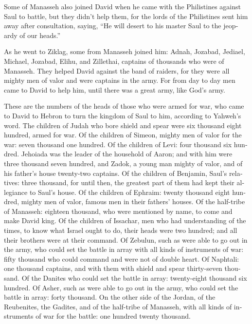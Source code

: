 \begin{paracol}{2}
\begin{otherlanguage}{english}
 Some of Manasseh also joined David when he came with the
Philistines against Saul to battle, but they didn't help them, for the
lords of the Philistines sent him away after consultation, saying, ``He
will desert to his master Saul to the jeopardy of our heads.''

 As he went to Ziklag, some from Manasseh joined him:
Adnah, Jozabad, Jediael, Michael, Jozabad, Elihu, and Zillethai,
captains of thousands who were of Manasseh.  They helped
David against the band of raiders, for they were all mighty men of valor
and were captains in the army.  For from day to day men
came to David to help him, until there was a great army, like God's
army.

 These are the numbers of the heads of those who were
armed for war, who came to David to Hebron to turn the kingdom of Saul
to him, according to Yahweh's word.  The children of
Judah who bore shield and spear were six thousand eight hundred, armed
for war.  Of the children of Simeon, mighty men of valor
for the war: seven thousand one hundred.  Of the children
of Levi: four thousand six hundred.  Jehoiada was the
leader of the household of Aaron; and with him were three thousand seven
hundred,  and Zadok, a young man mighty of valor, and of
his father's house twenty-two captains.  Of the children
of Benjamin, Saul's relatives: three thousand, for until then, the
greatest part of them had kept their allegiance to Saul's house.
 Of the children of Ephraim: twenty thousand eight
hundred, mighty men of valor, famous men in their fathers' houses.
 Of the half-tribe of Manasseh: eighteen thousand, who
were mentioned by name, to come and make David king.  Of
the children of Issachar, men who had understanding of the times, to
know what Israel ought to do, their heads were two hundred; and all
their brothers were at their command.  Of Zebulun, such
as were able to go out in the army, who could set the battle in array
with all kinds of instruments of war: fifty thousand who could command
and were not of double heart.  Of Naphtali: one thousand
captains, and with them with shield and spear thirty-seven thousand.
 Of the Danites who could set the battle in array:
twenty-eight thousand six hundred.  Of Asher, such as
were able to go out in the army, who could set the battle in array:
forty thousand.  On the other side of the Jordan, of the
Reubenites, the Gadites, and of the half-tribe of Manasseh, with all
kinds of instruments of war for the battle: one hundred twenty thousand.


\end{otherlanguage}
\end{paracol}
